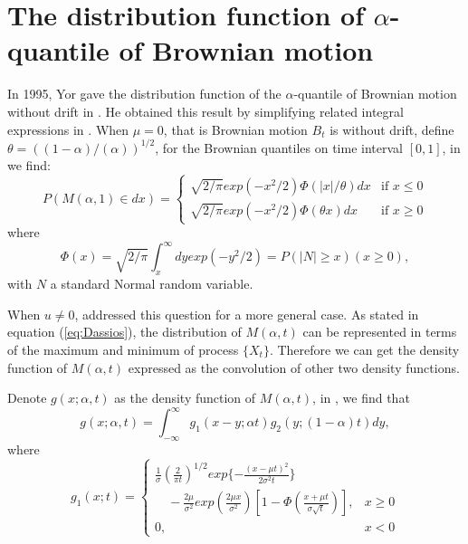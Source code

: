 \documentclass[12pt,oneside,titlepage]{book}
\begin{document}
\section{The distribution function of $\alpha$-quantile of Brownian motion}
In 1995, Yor gave the distribution function of the $\alpha$-quantile of Brownian motion without drift in \cite{Yor1995}. He obtained this result by simplifying related integral expressions in \cite{Miura}. When $\mu = 0$, that is Brownian motion $B_t$ is without drift, define $\theta = ((1 - \alpha)/(\alpha))^{1/2}$, for the Brownian quantiles on time interval $[0, 1]$,  in \cite{Yor1995} we find:
\begin{equation}
P(M(\alpha,1)\in dx)= \begin{cases}
\sqrt{2 / \pi}exp(-x^2 / 2) \Phi(|x| / \theta)dx  &  \text{if } x \leq 0 \\
\sqrt{2 / \pi}exp(-x^2 / 2) \Phi(\theta x)dx  &  \text{if } x \geq 0
\end{cases}
\end{equation}
where
\begin{equation}\label{eq:density}
\Phi (x) = \sqrt{2/ \pi} \int^{\infty}_x dy exp(-y^2 / 2) = P (|N| \geq x)     (x \geq 0),
\end{equation}
with $N$ a standard Normal random variable.


When $u \neq 0$,  \cite{Dassios1995} addressed this question for a more general case.  As stated in equation (\ref{eq:Dassios}), the distribution of $M(\alpha , t)$ can be represented in terms of the maximum and minimum of process $\{X_t\}$. Therefore we can get the density function of $M(\alpha, t)$ expressed as the convolution of other two density functions.

Denote $g(x; \alpha , t)$ as the density function of $M(\alpha , t)$, in \cite{Dassios1995}, we find that
\begin{equation}\label{eq:fulldensity}
g(x; \alpha , t) = \int^{\infty}_{-\infty} g_1 (x-y; \alpha t) g_2 (y; (1-\alpha) t)dy ,
\end{equation}
where
\begin{equation}
g_1 (x;t) = \begin{cases}
\frac{1}{\sigma}({\frac{2}{\pi t}})^{1/2}exp\{-\frac{(x-\mu t)^2}{2\sigma ^2 t}\} \\
\quad - \frac{2\mu}{\sigma ^2} exp(\frac{2\mu x}{\sigma ^2})[1- \Phi (\frac{x+\mu t}{\sigma \sqrt{t}})], & x \geq 0 \\
0 , & x  < 0 
\end{cases}
\end{equation}
\end{document}
